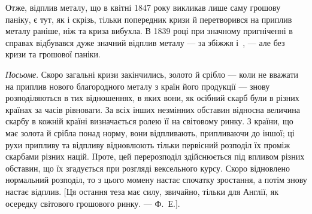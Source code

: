 Отже, відплив металу, що в квітні 1847 року викликав лише саму грошову
паніку, є тут, як і скрізь, тільки попередник кризи й перетворився на
приплив металу раніше, ніж та криза вибухла. В 1839 році при значному пригніченні
в справах відбувався дуже значний відплив металу — за збіжжя і~, —
але без кризи та грошової паніки.

\emph{Посьоме}. Скоро загальні кризи закінчились, золото й срібло — коли не
вважати на приплив нового благородного металу з країн його продукції —
знову розподіляються в тих відношеннях, в яких вони, як осібний скарб
були в різних країнах за часів рівноваги. За всіх інших незмінних обставин
відносна величина скарбу в кожній країні визначається ролею її на світовому
ринку. З країни, що має золота й срібла понад норму, вони відпливають, припливаючи
до іншої; ці рухи припливу та відпливу відновлюють тільки первісний
розподіл їх проміж скарбами різних націй. Проте, цей перерозподіл здійснюється
під впливом різних обставин, що їх згадується при розгляді вексельного курсу.
Скоро відновлено нормальний розподіл, то з цього момену настає спочатку зростання,
а потім знову настає відплив. [Ця остання теза має силу, звичайно,
тільки для Англії, як осередку світового грошового ринку. — Ф.~Е.].
